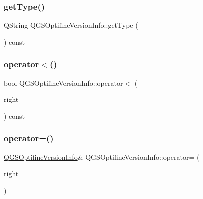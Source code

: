 \mbox{\label{class_q_g_s_optifine_version_info_ae3553e4d2fba6412369b4efa6cbfbb1f}} 
\subsubsection{\texorpdfstring{get\+Type()}{getType()}}
{\footnotesize\ttfamily Q\+String Q\+G\+S\+Optifine\+Version\+Info\+::get\+Type (\begin{DoxyParamCaption}{ }\end{DoxyParamCaption}) const}

\mbox{\label{class_q_g_s_optifine_version_info_a6309e757158d958196001474f480a7bc}} 
\subsubsection{\texorpdfstring{operator$<$()}{operator<()}}
{\footnotesize\ttfamily bool Q\+G\+S\+Optifine\+Version\+Info\+::operator$<$ (\begin{DoxyParamCaption}\item[{const \mbox{\hyperlink{class_q_g_s_optifine_version_info}{Q\+G\+S\+Optifine\+Version\+Info}} \&}]{right }\end{DoxyParamCaption}) const}

\mbox{\label{class_q_g_s_optifine_version_info_a760d9b26e37489878634aa588fd91343}} 
\subsubsection{\texorpdfstring{operator=()}{operator=()}\hspace{0.1cm}{\footnotesize\ttfamily [1/2]}}
{\footnotesize\ttfamily \mbox{\hyperlink{class_q_g_s_optifine_version_info}{Q\+G\+S\+Optifine\+Version\+Info}}\& Q\+G\+S\+Optifine\+Version\+Info\+::operator= (\begin{DoxyParamCaption}\item[{const \mbox{\hyperlink{class_q_g_s_optifine_version_info}{Q\+G\+S\+Optifine\+Version\+Info}} \&}]{right }\end{DoxyParamCaption})\hspace{0.3cm}{\ttfamily [default]}}

